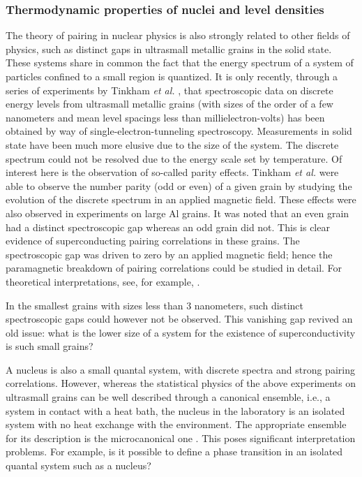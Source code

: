 \documentclass[rmp,aps,floatfix]{revtex4}
\begin{document}
\subsubsection{Thermodynamic properties of nuclei and level densities}

The theory of pairing in nuclear physics is also strongly related 
to other fields of physics, such as distinct gaps in 
ultrasmall metallic grains in the 
solid state. These systems share in 
common the fact that the energy spectrum of a system of particles 
confined to a small region is quantized. 
It is only recently, through a series of experiments by Tinkham {\em et al.}
\cite{tinkham95,tinkham96,tinkham98}, that spectroscopic data on discrete energy levels from
ultrasmall metallic grains (with sizes of the order of a few nanometers 
and mean level spacings less than millielectron-volts) 
has been
obtained by way of single-electron-tunneling spectroscopy. 
Measurements in solid state have been much more elusive due to the size
of the system. The discrete spectrum could not be resolved due to the 
energy scale set by temperature.
Of interest here is the observation of so-called parity effects. 
Tinkham {\em et al.}
\cite{tinkham95,tinkham96,tinkham98} were able to observe the number parity (odd or even)
of a given grain by studying the evolution of the discrete spectrum 
in an applied magnetic field.
These effects were also observed in experiments on large Al grains.
It was noted that an even grain had a distinct spectroscopic gap 
whereas an odd grain did not. This is clear evidence of superconducting
pairing correlations in these grains.
The spectroscopic gap was driven to zero by an applied magnetic field;
hence the paramagnetic breakdown of pairing correlations could be studied in 
detail. For theoretical interpretations, 
see, for example, \cite{delft2000,balian1999,mastellone98,sierra99}.


In the smallest grains with sizes less than 3 nanometers, such 
distinct spectroscopic gaps could however not be observed. This vanishing gap
revived an old issue: what is the lower size of a system for the existence
of superconductivity is  such small grains? 

A  nucleus is also a small quantal system, with discrete spectra and strong
pairing correlations. However, whereas the statistical physics of the
above experiments on ultrasmall
grains can be well described through a canonical ensemble, i.e., 
a system in contact with a heat bath, the nucleus in the laboratory 
is an isolated system with no heat exchange with the environment.
The appropriate ensemble for its description is the 
microcanonical one \cite{balian1999}.
This poses significant interpretation problems. For example, 
is it possible to define 
a phase transition in an isolated quantal system such as a nucleus?  
\end{document}
